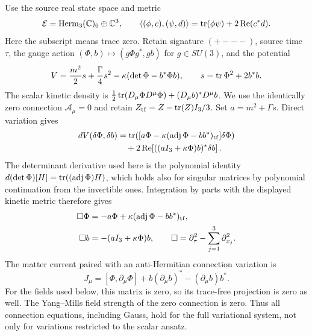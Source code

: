Use the source real state space and metric
\[
 \mathcal E=\operatorname{Herm}_3(\mathbb C)_0\oplus\mathbb C^3,
 \qquad
 \langle(\phi,c),(\psi,d)\rangle
   =\operatorname{tr}(\phi\psi)+2\operatorname{Re}(c^*d).
\]
Here the subscript means trace zero. Retain signature $(+---)$, source
time $\tau$, the gauge action $(\Phi,b)\mapsto(g\Phi g^*,gb)$ for $g\in SU(3)$,
and the potential
\begin{equation}\label{eq:s6dyn-potential}
 V=\frac{m^2}{2}s+\frac{\Gamma}{4}s^2
       -\kappa(\det\Phi-b^*\Phi b),\qquad
 s=\operatorname{tr}\Phi^2+2b^*b.
\end{equation}
The scalar kinetic density is
$\tfrac12\operatorname{tr}(D_\mu\Phi D^\mu\Phi)+(D_\mu b)^*D^\mu b$.
We use the identically zero connection $\mathcal A_\mu=0$ and retain
$Z_{\rm tf}=Z-\operatorname{tr}(Z)I_3/3$. Set $a=m^2+\Gamma s$. Direct variation gives
\begin{align}
 dV(\delta\Phi,\delta b)
 &=\operatorname{tr}\!\left([a\Phi-\kappa(\operatorname{adj}\Phi-bb^*)_{\rm tf}]
                   \delta\Phi\right)\notag\\
 &\quad+2\operatorname{Re}\!\left[((aI_3+\kappa\Phi)b)^*
                   \delta b\right].\label{eq:s6dyn-variation}
\end{align}
The determinant derivative used here is the polynomial identity
$d(\det\Phi)[H]=\operatorname{tr}((\operatorname{adj}\Phi)H)$, which holds also for
singular matrices by polynomial continuation from the invertible ones.
Integration by parts with the displayed kinetic metric therefore gives
\begin{align}
 \Box\Phi&=-a\Phi+\kappa(\operatorname{adj}\Phi-bb^*)_{\rm tf},\notag\\
 \Box b&=-(aI_3+\kappa\Phi)b,\qquad
 \Box=\partial_\tau^2-\sum_{j=1}^3\partial_{x_j}^2.
 \label{eq:s6dyn-full}
\end{align}
The matter current paired with an anti-Hermitian connection variation is
\[
 J_\mu=[\Phi,\partial_\mu\Phi]
       +b(\partial_\mu b)^*-(\partial_\mu b)b^*.
\]
For the fields used below, this matrix is zero, so its trace-free projection
is zero as well. The Yang--Mills field strength of the zero connection is
zero. Thus all connection equations, including Gauss, hold for the full
variational system, not only for variations restricted to the scalar ansatz.

